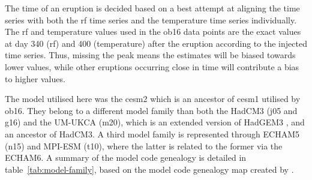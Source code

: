 \documentclass{ametsocV6.1}
\newcommand{\iso}[1][i]{{#1}njected \ce{SO2}}
\begin{document}
The time of an eruption is decided based on a best attempt at aligning the  time
series with both the \gls{rf} time series and the temperature time series individually.
The \gls{rf} and temperature values used in the \gls{ob16} data points are the exact
values at day 340 (\gls{rf}) and 400 (temperature) after the eruption according to the
\iso{} time series. Thus, missing the peak means the estimates will be biased towards
lower values, while other eruptions occurring close in time will contribute a bias to
higher values.

\appendix[C]


The model utilised here was the \gls{cesm2} which is an ancestor of \gls{cesm1} utilised
by \gls{ob16}. They belong to a different model family than both the HadCM3 (\gls{j05}
and \gls{g16}) and the UM-UKCA (\gls{m20}), which is an extended version of HadGEM3
\citep{dhomse2014}, and an ancestor of HadCM3. A third model family is represented
through ECHAM5 (\gls{n15}) and MPI-ESM (\gls{t10}), where the latter is related to the
former via the ECHAM6. A summary of the model code genealogy is detailed in
table~\ref{tab:model-family}, based on the model code genealogy map created by
\citet{kuma2023}.
\end{document}
